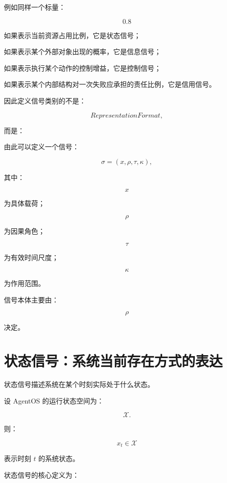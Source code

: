 例如同样一个标量：

\[
0.8
\]

如果表示当前资源占用比例，它是状态信号；

如果表示某个外部对象出现的概率，它是信息信号；

如果表示执行某个动作的控制增益，它是控制信号；

如果表示某个内部结构对一次失败应承担的责任比例，它是信用信号。

因此定义信号类别的不是：

\[
RepresentationFormat,
\]

而是：

\begin{statementbox}
\centering
{}
\end{statementbox}

由此可以定义一个信号：

\[
\sigma
=
(x,\rho,\tau,\kappa),
\]

其中：

\[
x
\]

为具体载荷；

\[
\rho
\]

为因果角色；

\[
\tau
\]

为有效时间尺度；

\[
\kappa
\]

为作用范围。

信号本体主要由：

\[
\rho
\]

决定。

\section{状态信号：系统当前存在方式的表达}

状态信号描述系统在某个时刻实际处于什么状态。

设 AgentOS 的运行状态空间为：

\[
\mathcal X.
\]

则：

\[
x_t\in\mathcal X
\]

表示时刻 $t$ 的系统状态。

状态信号的核心定义为：

\begin{statementbox}
\centering
{}
\end{statementbox}

